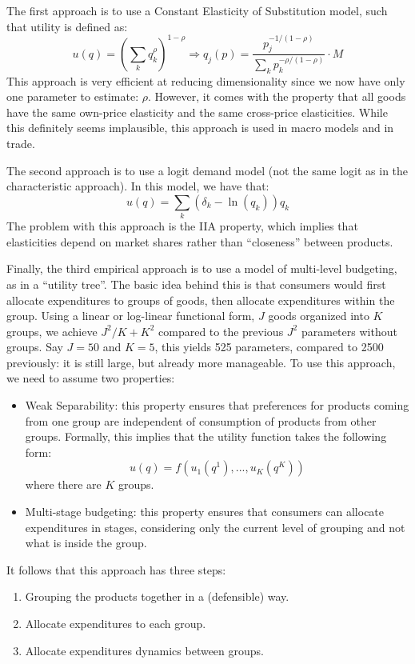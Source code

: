 The first approach is to use a Constant Elasticity of Substitution model, such that utility is defined as: $$ u(q) = \left(\sum_k q_k^\rho\right)^{1-\rho} \Rightarrow q_j(p) = \frac{p_j^{-1/(1-\rho)}}{\sum_k p_k^{-\rho/(1-\rho)}} \cdot M $$
This approach is very efficient at reducing dimensionality since we now have only one parameter to estimate: $\rho$. However, it comes with the property that all goods have the same own-price elasticity and the same cross-price elasticities. While this definitely seems implausible, this approach is used in macro models and in trade.

The second approach is to use a logit demand model (not the same logit as in the characteristic approach). In this model, we have that: $$ u(q) = \sum_k (\delta_k - \ln(q_k))q_k $$ The problem with this approach is the IIA property, which implies that elasticities depend on market shares rather than ``closeness'' between products.

Finally, the third empirical approach is to use a model of multi-level budgeting, as in a ``utility tree''. The basic idea behind this is that consumers  would first allocate expenditures to groups of goods, then allocate expenditures within the group. Using a linear or log-linear functional form, $J$ goods organized into $K$ groups, we achieve $J^2	/K + K^2$ compared to the previous $J^2$ parameters without groups. Say $J = 50$ and $K=5$, this yields 525 parameters, compared to 2500 previously: it is still large, but already more manageable. To use this approach, we need to assume two properties:\begin{itemize}
\item Weak Separability: this property ensures that preferences for products coming from one group are independent of consumption of products from other groups. Formally, this implies that the utility function takes the following form: $$ u(q) = f(u_1(q^1), ..., u_K(q^K)) $$ where there are $K$ groups.
\item Multi-stage budgeting: this property ensures that consumers can allocate expenditures in stages, considering only the current level of grouping and not what is inside the group.
\end{itemize}

It follows that this approach has three steps: \begin{enumerate}
\item Grouping the products together in a (defensible) way.
\item Allocate expenditures to each group.
\item Allocate expenditures dynamics between groups.
\end{enumerate}

